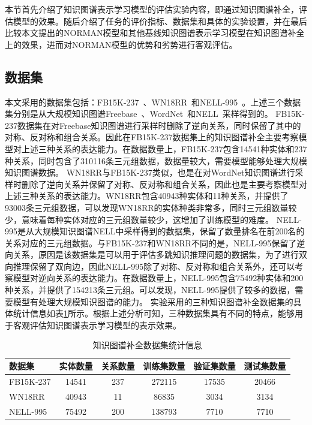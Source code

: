 \documentclass[algorithmlist, AutoFakeBold, AutoFakeSlant, figurelist, tablelist, nomlist, engineering]{seuthesix}
\begin{document}
本节首先介绍了知识图谱表示学习模型的评估实验内容，即通过知识图谱补全，评估模型的效果。随后介绍了任务的评价指标、数据集和具体的实验设置，并在最后比较本文提出的NORMAN模型和其他基线知识图谱表示学习模型在知识图谱补全上的效果，进而对NORMAN模型的优势和劣势进行客观评估。

\subsection{数据集}
本文采用的数据集包括：FB15K-237~\cite{toutanova2015representing}、WN18RR~\cite{dettmers2018convolutional}和NELL-995~\cite{xiong2017deeppath}。上述三个数据集分别是从大规模知识图谱Freebase~\cite{bollacker2008freebase}、WordNet~\cite{glorot2010understanding}和NELL~\cite{carlson2010toward}采样得到的。
FB15K-237数据集在对Freebase知识图谱进行采样时删除了逆向关系，同时保留了其中的对称、反对称和组合关系。因此在FB15K-237数据集上的知识图谱补全主要考察模型对上述三种关系的表达能力。在数据数量上，FB15K-237包含14541种实体和237种关系，同时包含了310116条三元组数据，数据量较大，需要模型能够处理大规模知识图谱数据。
WN18RR与FB15K-237类似，也是在对WordNet知识图谱进行采样时删除了逆向关系并保留了对称、反对称和组合关系，因此也是主要考察模型对上述三种关系的表达能力。WN18RR包含40943种实体和11种关系，并提供了93003条三元组数据，可以发现WN18RR的实体种类非常多，同时三元组数量较少，意味着每种实体对应的三元组数量较少，这增加了训练模型的难度。
NELL-995是从大规模知识图谱NELL中采样得到的数据集，保留了数量排名在前200名的关系对应的三元组数据。与FB15K-237和WN18RR不同的是，NELL-995保留了逆向关系，原因是该数据集是可以用于评估多跳知识推理问题的数据集，为了进行双向推理保留了双向边，因此NELL-995除了对称、反对称和组合关系外，还可以考察模型对逆向关系的表达能力。在数据数量上，NELL-995包含75492种实体和200种关系，并提供了154213条三元组。可以发现，NELL-995提供了较多的数据，需要模型有处理大规模知识图谱的能力。
实验采用的三种知识图谱补全数据集的具体统计信息如表\ref{Datasets1}所示。根据上述分析可知，三种数据集具有不同的特点，能够用于客观评估知识图谱表示学习模型的表示效果。
\begin{table}[]
  \centering
  \begin{tabular*}{0.95\textwidth}{@{\extracolsep{\fill}}lccccc}
  \toprule[1pt]
  数据集 & 实体数量 & 关系数量 & 训练集数量 & 验证集数量 & 测试集数量 \\ \hline
  FB15K-237 & 14541 & 237 & 272115 & 17535 & 20466\\
  WN18RR & 40943 & 11 & 86835 & 3034 & 3134\\
  NELL-995 & 75492 & 200 & 138793 & 7710 & 7710\\
  \bottomrule[1pt]
	\end{tabular*}
  \caption{知识图谱补全数据集统计信息}
  \label{Datasets1}
\end{table}
\end{document}
